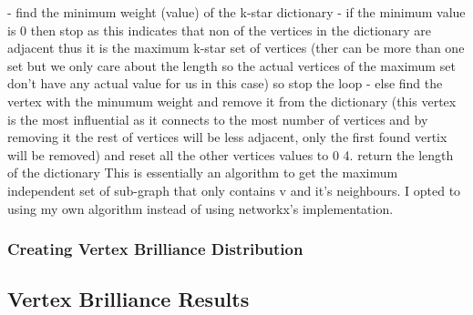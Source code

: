 \documentclass[11pt,a4paper,notitlepage]{article}
\begin{document}
            - find the minimum weight (value) of the k-star dictionary 
            - if the minimum value is 0 then stop as this indicates that non of the vertices in the dictionary are adjacent thus it is the maximum k-star set of vertices (ther can be more than one set but we only care about the length so the actual vertices of the maximum set don't have any actual value for us in this case) so stop the loop
            - else find the vertex with the minumum weight and remove it from the dictionary (this vertex is the most influential as it connects to the most number of vertices and by removing it the rest of vertices will be less adjacent, only the first found vertix will be removed) and reset all the other vertices values to 0 
    4. return the length of the dictionary 
This is essentially an algorithm to get the maximum independent set of sub-graph that only contains v and it's neighbours. I opted to using my own algorithm instead of using networkx's implementation. 
\subsubsection*{Creating Vertex Brilliance Distribution}

\subsection*{Vertex Brilliance Results}
\end{document}
